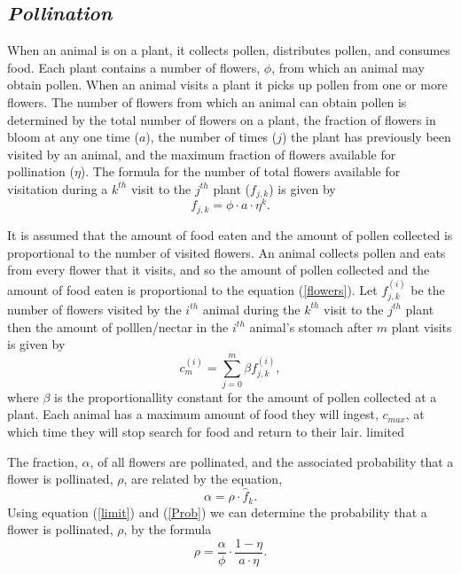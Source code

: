 \subsection{\emph{Pollination}}
  When an animal is on a plant, it collects pollen, distributes pollen, and consumes food. Each
  plant contains a number of flowers, $\phi$, from which an animal may obtain pollen. When an animal
  visits a plant it picks up pollen from one or more flowers. The number of flowers from which an
  animal can obtain pollen is determined by the total number of flowers on a plant, the fraction of
  flowers in bloom at any one time ($a$), the number of times ($j$) the plant has previously been
  visited by an animal, and the maximum fraction of flowers available for pollination ($\eta$). The
  formula for the number of total flowers available for visitation during a $k^{th}$ visit to the
  $j^{th}$ plant ($f_{j,k}$) is given by
  \begin{equation}\label{flowers}
    f_{j,k} = \phi \cdot a \cdot \eta^k.
  \end{equation}

  It is assumed that the amount of food eaten and the amount of pollen collected is proportional to
  the number of visited flowers. An animal collects pollen and eats from every flower that it
  visits, and so the amount of pollen collected and the amount of food eaten is proportional to the
  equation (\ref{flowers}). Let $f^{\left(i\right)}_{j,k}$ be the number of flowers visited by the
  $i^{th}$ animal during the $k^{th}$ visit to the $j^{th}$ plant then the amount of polllen/nectar
  in the $i^{th}$ animal's stomach after $m$ plant visits is given by
  \[
    c^{\left(i\right)}_m = \sum_{j=0}^{m} \beta f^{\left(i\right)}_{j,k},
  \]
  where $\beta$ is the proportionallity constant for the amount of pollen collected at a plant.
  Each animal has a maximum amount of food they will ingest, $c_{max}$, at which time they will stop
  search for food and return to their lair. %
  limited

  The fraction, $\alpha$, of all flowers are pollinated, and the associated probability that a
  flower is pollinated, $\rho$, are related by the equation,
  \begin{equation} \label{Prob}
    \alpha = \rho \cdot \hat{f}_k.
  \end{equation}
  Using equation (\ref{limit}) and (\ref{Prob}) we can determine the probability that a flower is
  pollinated, $\rho$, by the formula
  \[
    \rho = \frac{\alpha}{\phi} \cdot \frac{1 - \eta}{a \cdot \eta}.
  \]

